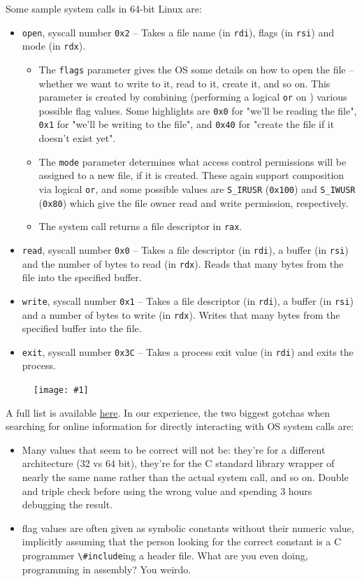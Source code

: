 \documentclass{article}
\newcommand{\wrapimageright}[1] {
    \begin{figure}
        \begin{center}
            \texttt{[image: \#1]} 
        \end{center}
    \end{figure}
}
\newcommand{\xcode}[2]{\colorbox{ubuntuback}{\lstinline[language=#1]|#2|}}
\newcommand{\asm}[1]{\xcode{{[x86masm]assembler}}{#1}}
\newcommand{\code}[1]{\colorbox{ubuntuback}{\texttt{#1}}}
\begin{document}
Some sample system calls in 64-bit Linux are: 
\begin{itemize}
    \item \code{open}, syscall number \code{0x2} -- Takes a file name (in \asm{rdi}), flags (in \asm{rsi}) and mode (in \asm{rdx}). 
        \begin{itemize}
            \item The \code{flags} parameter gives the OS some details on how to open the file -- whether we want to write to it, read to it, create it, and so on. This parameter is created by combining (performing a logical \code{or} on ) various possible flag values. Some highlights are \code{0x0} for "we'll be reading the file", \code{0x1} for "we'll be writing to the file", and \code{0x40} for "create the file if it doesn't exist yet". 
            \item The \code{mode} parameter determines what access control permissions will be assigned to a new file, if it is created. These again support composition via logical \code{or}, and some possible values are \code{S\_IRUSR} (\code{0x100}) and \code{S\_IWUSR} (\code{0x80}) which give the file owner read and write permission, respectively. 
            \item The system call returns a file descriptor in \asm{rax}.
        \end{itemize}
    \item \code{read}, syscall number \code{0x0}  -- Takes a file descriptor (in \asm{rdi}), a buffer (in \asm{rsi}) and the number of bytes to read (in \asm{rdx}). Reads that many bytes from the file into the specified buffer.
    \item \code{write}, syscall number \code{0x1} -- Takes a file descriptor (in \asm{rdi}), a buffer (in \asm{rsi}) and a number of bytes to write (in \asm{rdx}). Writes that many bytes from the specified buffer into the file.
    \item \code{exit}, syscall number \code{0x3C} -- Takes a process exit value (in \asm{rdi}) and exits the process.
\end{itemize}

\wrapimageright{./images/system_call.png}
A full list is available \href{https://blog.rchapman.org/posts/Linux_System_Call_Table_for_x86_64/}{here}. In our experience, the two biggest gotchas when searching for online information for directly interacting with OS system calls are:

\begin{itemize}
    \item Many values that seem to be correct will not be: they're for a different architecture (32 vs 64 bit), they're for the C standard library wrapper of nearly the same name rather than the actual system call, and so on. Double and triple check before using the wrong value and spending 3 hours debugging the result.
    \item flag values are often given as symbolic constants without their numeric value, implicitly assuming that the person looking for the correct constant is a C programmer \xcode{C}{\#include}ing a header file. What are you even doing, programming in assembly? You weirdo.
\end{itemize}
\end{document}

